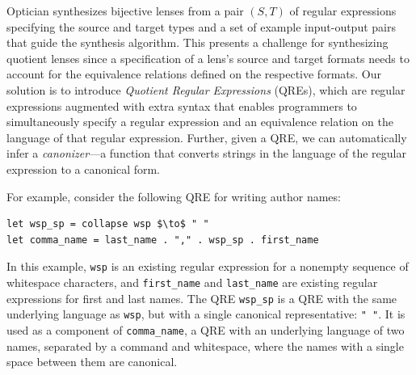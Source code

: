 \documentclass[acmsmall,screen]{acmart}
\begin{document}
Optician synthesizes bijective lenses from a pair $(S, T)$ of regular
expressions
specifying the source and target types and a set of example input-output pairs
that guide the synthesis algorithm. This presents a challenge for synthesizing
quotient lenses since a specification of a lens's source and target formats
needs to account for the equivalence relations defined on the
respective formats. Our solution is to introduce {\em Quotient Regular
Expressions} (QREs), which are regular expressions augmented with extra
syntax that enables programmers to simultaneously specify a regular expression
and an equivalence relation on the language of that regular expression.
Further, given a QRE, we can automatically infer a \emph{canonizer}---a
function that converts strings in the language of the regular expression
to a canonical form.

For example, consider the following QRE for writing author
names:
%
\begin{lstlisting}
let wsp_sp = collapse wsp $\to$ " "
let comma_name = last_name . "," . wsp_sp . first_name
\end{lstlisting}
%
In this example, \lstinline{wsp} is an existing regular expression for a
nonempty sequence of whitespace characters, and \lstinline{first_name} and
\lstinline{last_name} are existing regular expressions for first and last names.
The QRE \lstinline{wsp_sp} is a QRE with the same underlying language as
\lstinline{wsp}, but with a single canonical representative: \lstinline{" "}.
It is used as a component of \lstinline{comma_name}, a QRE with an
underlying language of two names, separated by a command and whitespace, where
the names with a single space between them are canonical.

\end{document}
